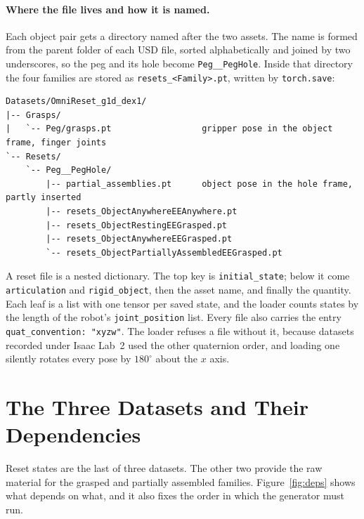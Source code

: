 \documentclass{article}
\newcommand{\code}[1]{\texttt{#1}}
\begin{document}
\paragraph{Where the file lives and how it is named.}
Each object pair gets a directory named after the two assets. The name is formed from the parent folder of each USD file, sorted alphabetically and joined by two underscores, so the peg and its hole become \code{Peg\_\_PegHole}. Inside that directory the four families are stored as \code{resets\_<Family>.pt}, written by \code{torch.save}:

\begin{lstlisting}
Datasets/OmniReset_g1d_dex1/
|-- Grasps/
|   `-- Peg/grasps.pt                  gripper pose in the object frame, finger joints
`-- Resets/
    `-- Peg__PegHole/
        |-- partial_assemblies.pt      object pose in the hole frame, partly inserted
        |-- resets_ObjectAnywhereEEAnywhere.pt
        |-- resets_ObjectRestingEEGrasped.pt
        |-- resets_ObjectAnywhereEEGrasped.pt
        `-- resets_ObjectPartiallyAssembledEEGrasped.pt
\end{lstlisting}

A reset file is a nested dictionary. The top key is \code{initial\_state}; below it come \code{articulation} and \code{rigid\_object}, then the asset name, and finally the quantity. Each leaf is a list with one tensor per saved state, and the loader counts states by the length of the robot's \code{joint\_position} list. Every file also carries the entry \code{quat\_convention: "xyzw"}. The loader refuses a file without it, because datasets recorded under Isaac Lab~2 used the other quaternion order, and loading one silently rotates every pose by $180^\circ$ about the $x$ axis.

\section{The Three Datasets and Their Dependencies}
\label{sec:three}

Reset states are the last of three datasets. The other two provide the raw material for the grasped and partially assembled families. Figure~\ref{fig:deps} shows what depends on what, and it also fixes the order in which the generator must run.
\end{document}
